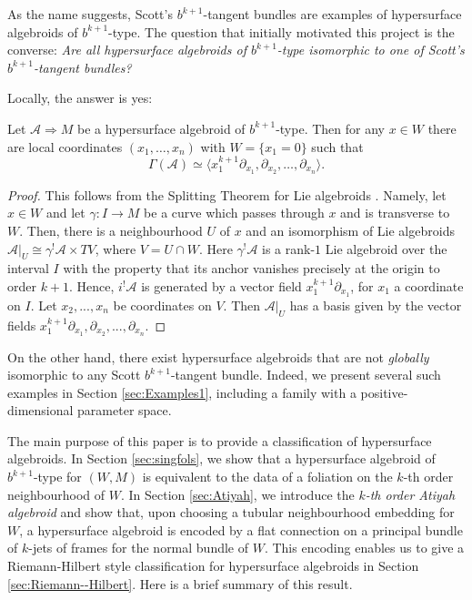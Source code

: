 \documentclass[10pt]{amsart}
\newcommand{\A}{{\mathcal{A}}}
\newcommand{\inp}[1]{\langle #1\rangle}
\numberwithin{theoremalpha}{section}
\numberwithin{equation}{section}
\numberwithin{definition}{section}
\numberwithin{theorem}{section}
\numberwithin{proposition}{section}
\numberwithin{lemma}{section}
\numberwithin{example}{section}
\numberwithin{remark}{section}
\numberwithin{corollary}{section}
\numberwithin{question}{section}
\numberwithin{problem}{section}
\numberwithin{assumption}{section}
\theoremstyle{named}
\numberwithin{equation}{section}
\begin{document}
As the name suggests, Scott's $b^{k+1}$-tangent bundles are examples of hypersurface algebroids of $b^{k+1}$-type. The question that initially motivated this project is the converse: \emph{Are all hypersurface algebroids of $b^{k+1}$-type isomorphic to one of Scott's $b^{k+1}$-tangent bundles?}

Locally, the answer is yes:
\begin{proposition}\label{prop:localformhypersurfacealgebroid}
Let $\A \Rightarrow M$ be a hypersurface algebroid of $b^{k+1}$-type. Then for any $x \in W$ there are local coordinates $(x_1,\ldots,x_n)$ with $W = \{ x_1 = 0 \}$ such that
\begin{equation}\label{eq:localform}
\Gamma(\A) \simeq \inp{x_1^{k+1}\partial_{x_1},\partial_{x_2},\ldots,\partial_{x_n}}.
\end{equation}
\end{proposition}
\begin{proof}
This follows from the Splitting Theorem for Lie algebroids \cite{Duf01, Fer02, Wei00, BLM19}. Namely, let $x \in W$ and let $\gamma: I \to M$ be a curve which passes through $x$ and is transverse to $W$. Then, there is a neighbourhood $U$ of $x$ and an isomorphism of Lie algebroids $\A|_U \cong \gamma^{!}\A \times TV$, where $V = U \cap W$. Here $\gamma^{!}\A$ is a rank-$1$ Lie algebroid over the interval $I$ with the property that its anchor vanishes precisely at the origin to order $k+1$. Hence, $i^{!}\A$ is generated by a vector field $x_{1}^{k+1} \partial_{x_{1}}$, for $x_{1}$ a coordinate on $I$. Let $x_{2}, ..., x_{n}$ be coordinates on $V$. Then $\A|_U$ has a basis given by the vector fields $x_{1}^{k+1} \partial_{x_{1}}, \partial_{x_{2}}, ..., \partial_{x_{n}}$.
\end{proof}

On the other hand, there exist hypersurface algebroids that are not \emph{globally} isomorphic to any Scott $b^{k+1}$-tangent bundle. Indeed, we present several such examples in Section \ref{sec:Examples1}, including a family with a positive-dimensional parameter space. 

The main purpose of this paper is to provide a classification of hypersurface algebroids. In Section \ref{sec:singfols}, we show that a hypersurface algebroid of $b^{k+1}$-type for $(W,M)$ is equivalent to the data of a foliation on the $k$-th order neighbourhood of $W$. In Section \ref{sec:Atiyah}, we introduce the \emph{$k$-th order Atiyah algebroid} and show that, upon choosing a tubular neighbourhood embedding for $W$, a hypersurface algebroid is encoded by a flat connection on a principal bundle of $k$-jets of frames for the normal bundle of $W$. This encoding enables us to give a Riemann-Hilbert style classification for hypersurface algebroids in Section \ref{sec:Riemann--Hilbert}. Here is a brief summary of this result. 
\end{document}
